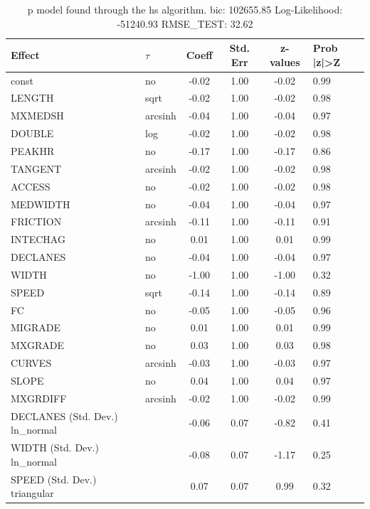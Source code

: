\begin{table}
	\caption{p model found through the hs algorithm. bic: 102655.85 Log-Likelihood: -51240.93 RMSE_TEST: 32.62}
	\begin{center}
		\begin{tabular}{|l|l|c|c|c|l|}
			\hline
			Effect & $\tau$ & Coeff & Std. Err & z-values & Prob |z|>Z \\
			\hline
			const & no & -0.02 & 1.00 & -0.02 & 0.99 \\
			\hline
			LENGTH & sqrt & -0.02 & 1.00 & -0.02 & 0.98 \\
			\hline
			MXMEDSH & arcsinh & -0.04 & 1.00 & -0.04 & 0.97 \\
			\hline
			DOUBLE & log & -0.02 & 1.00 & -0.02 & 0.98 \\
			\hline
			PEAKHR & no & -0.17 & 1.00 & -0.17 & 0.86 \\
			\hline
			TANGENT & arcsinh & -0.02 & 1.00 & -0.02 & 0.98 \\
			\hline
			ACCESS & no & -0.02 & 1.00 & -0.02 & 0.98 \\
			\hline
			MEDWIDTH & no & -0.04 & 1.00 & -0.04 & 0.97 \\
			\hline
			FRICTION & arcsinh & -0.11 & 1.00 & -0.11 & 0.91 \\
			\hline
			INTECHAG & no & 0.01 & 1.00 & 0.01 & 0.99 \\
			\hline
			DECLANES & no & -0.04 & 1.00 & -0.04 & 0.97 \\
			\hline
			WIDTH & no & -1.00 & 1.00 & -1.00 & 0.32 \\
			\hline
			SPEED & sqrt & -0.14 & 1.00 & -0.14 & 0.89 \\
			\hline
			FC & no & -0.05 & 1.00 & -0.05 & 0.96 \\
			\hline
			MIGRADE & no & 0.01 & 1.00 & 0.01 & 0.99 \\
			\hline
			MXGRADE & no & 0.03 & 1.00 & 0.03 & 0.98 \\
			\hline
			CURVES & arcsinh & -0.03 & 1.00 & -0.03 & 0.97 \\
			\hline
			SLOPE & no & 0.04 & 1.00 & 0.04 & 0.97 \\
			\hline
			MXGRDIFF & arcsinh & -0.02 & 1.00 & -0.02 & 0.99 \\
			\hline
			DECLANES (Std. Dev.) ln_normal &  & -0.06 & 0.07 & -0.82 & 0.41 \\
			\hline
			WIDTH (Std. Dev.) ln_normal &  & -0.08 & 0.07 & -1.17 & 0.25 \\
			\hline
			SPEED (Std. Dev.) triangular &  & 0.07 & 0.07 & 0.99 & 0.32 \\

\end{tabular}
\end{center}
\end{table}
